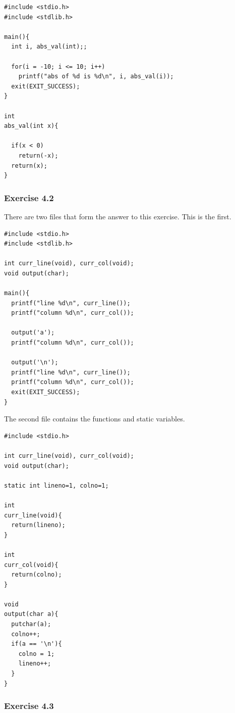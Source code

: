    \begin{Verbatim}
#include <stdio.h>
#include <stdlib.h>

main(){
  int i, abs_val(int);;

  for(i = -10; i <= 10; i++)
    printf("abs of %d is %d\n", i, abs_val(i));
  exit(EXIT_SUCCESS);
}

int
abs_val(int x){

  if(x < 0)
    return(-x);
  return(x);
}
\end{Verbatim}

  

  \subsubsection*{Exercise 4.2}

   There are two files that form the answer to this exercise. This is the
    first.


   \begin{Verbatim}
#include <stdio.h>
#include <stdlib.h>

int curr_line(void), curr_col(void);
void output(char);

main(){
  printf("line %d\n", curr_line());
  printf("column %d\n", curr_col());

  output('a');
  printf("column %d\n", curr_col());

  output('\n');
  printf("line %d\n", curr_line());
  printf("column %d\n", curr_col());
  exit(EXIT_SUCCESS);
}
\end{Verbatim}

   The second file contains the functions and static variables.


   \begin{Verbatim}
#include <stdio.h>

int curr_line(void), curr_col(void);
void output(char);

static int lineno=1, colno=1;

int
curr_line(void){
  return(lineno);
}

int
curr_col(void){
  return(colno);
}

void
output(char a){
  putchar(a);
  colno++;
  if(a == '\n'){
    colno = 1;
    lineno++;
  }
}
\end{Verbatim}

  

  \subsubsection*{Exercise 4.3}

